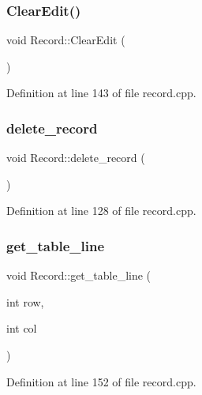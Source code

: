 \subsubsection{\texorpdfstring{ClearEdit()}{ClearEdit()}}
{\footnotesize\ttfamily void Record\+::\+Clear\+Edit (\begin{DoxyParamCaption}{ }\end{DoxyParamCaption})}



Definition at line 143 of file record.\+cpp.

\mbox{\label{class_record_a4c0e51ba399bdec6c9630b193914e7fb}} 
\subsubsection{\texorpdfstring{delete\_record}{delete\_record}}
{\footnotesize\ttfamily void Record\+::delete\+\_\+record (\begin{DoxyParamCaption}{ }\end{DoxyParamCaption})\hspace{0.3cm}{\ttfamily [slot]}}



Definition at line 128 of file record.\+cpp.

\mbox{\label{class_record_a89ae432465b31de8a27e2fe8e929b62a}} 
\subsubsection{\texorpdfstring{get\_table\_line}{get\_table\_line}}
{\footnotesize\ttfamily void Record\+::get\+\_\+table\+\_\+line (\begin{DoxyParamCaption}\item[{int}]{row,  }\item[{int}]{col }\end{DoxyParamCaption})\hspace{0.3cm}{\ttfamily [slot]}}



Definition at line 152 of file record.\+cpp.

\mbox{\label{class_record_a5fdd1f2b39a2de50ec73b57bb24bb8dc}} 
